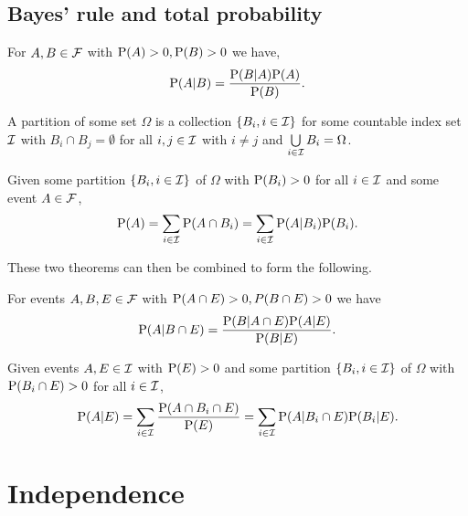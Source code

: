 \documentclass[../Year1/Year1.tex]{subfiles}
\begin{document}
\subsection{Bayes' rule and total probability}

\begingroup\belowdisplayskip=-10pt
\begin{theorem}
    For $A,B \in \FFF$ with $\P(A) >0, \P(B) > 0$ we have, \[
        \P(A|B) = \frac{\P(B|A)\P(A)}{\P(B)}
        \textcolor{black}{.}
        \]
\end{theorem}
\endgroup

\begin{definition}
    A partition of some set $\Omega$ is a collection $\{B_i, i \in \III\}$ for some countable index set $\III$ with $B_i \cap B_j = \emptyset$ for all $i,j\in\III$ with $i\neq j$ and $\bigcup\limits_{i\in\III}B_i = \Omega$.
\end{definition}

\begingroup\belowdisplayskip=-10pt
\begin{theorem}
    Given some partition $\{B_i, i\in\III\}$ of $\Omega$ with $\P(B_i)>0$ for all $i\in\III$ and some event $A\in\FFF$,\[
        \P(A)=\sum_{i\in\III}\P(A\cap B_i)=\sum_{i\in\III}\P(A|B_i)\P(B_i)\textcolor{black}{.}
    \]
\end{theorem}
\endgroup

These two theorems can then be combined to form the following.
\begingroup\belowdisplayskip=-10pt
\begin{theorem}
    For events $A,B,E \in \FFF$ with $\P(A\cap E)>0, P(B\cap E) > 0$ we have \[
    \P(A|B\cap E) = \frac{\P(B|A\cap E)\P(A|E)}{\P(B|E)}
    \textcolor{black}{.}
    \]
\end{theorem}
\endgroup

\begingroup\belowdisplayskip=-10pt
\begin{theorem}
    Given events $A,E\in\III$  with $\P(E)>0$ and some partition $\{B_i, i\in\III\}$ of $\Omega$ with $\P(B_i\cap E)>0$ for all $i\in\III$,
    \[
        \P(A|E)=\sum_{i\in\III}\frac{\P(A\cap B_i\cap E)}{\P(E)}
        =\sum_{i\in\III}\P(A|B_i\cap E)\P(B_i| E)
        \textcolor{black}{.}
    \]
\end{theorem}
\endgroup

\section{Independence}
\end{document}
